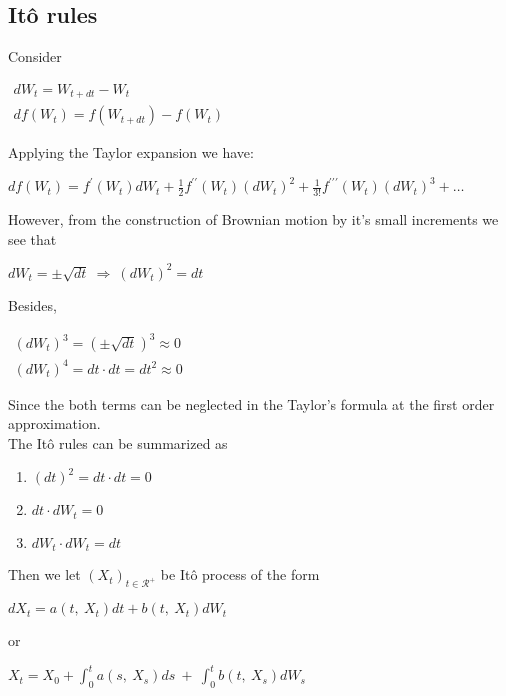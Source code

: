 \documentclass{article}
\begin{document}
\subsection{It\^{o} rules}%
Consider
\begin{center}
	$\begin{array}{l}dW_{t}=W_{t+dt}-W_{t}\\ df\left( W_{t}\right)  =f\left( W_{t+dt}\right)  -f\left( W_{t}\right)  \end{array} $
\end{center}
Applying the Taylor expansion we have:
\begin{center}
	$df\left( W_{t}\right)  =f^{\prime }\left( W_{t}\right)  dW_{t}+\frac{1}{2} f^{\prime \prime }\left( W_{t}\right)  \left( dW_{t}\right)^{2}  +\frac{1}{3!} f^{\prime \prime \prime }\left( W_{t}\right)  \left( dW_{t}\right)^{3}  +\ldots $
\end{center}
However, from the construction of Brownian motion by it's small increments we see that
\begin{center}
	$dW_{t}=\pm \sqrt{dt} \  \Rightarrow \  \left( dW_{t}\right)^{2}  =dt$
\end{center} 
Besides,
\begin{center}
	$\begin{array}{c}\left( dW_{t}\right)^{3}  =\left( \pm \sqrt{dt} \right)^{3}  \approx 0\\ \left( dW_{t}\right)^{4}  =dt\cdot dt=dt^{2}\approx 0\end{array} $
\end{center}
Since the both terms can be neglected in the Taylor's formula at the first order approximation.\\The 
It\^{o} rules can be summarized as
\begin{enumerate}[(1).]
	\item $\left( dt\right)^{2}  =dt\cdot dt=0$
	\item $dt\cdot dW_{t}=0$
	\item $dW_{t}\cdot dW_{t}=dt$
\end{enumerate}
\noindent
Then we let  $(X_{t})_{t\in \mathscr{R}^{+}}$ be It\^{o} process of the form
\begin{center}
	$dX_{t}=a\left( t,\  X_{t}\right)  dt+b\left( t,\  X_{t}\right)  dW_{t}$
\end{center}
or
\begin{center}
	$X_{t}=X_{0}+\int^{t}_{0} a\left( s,\  X_{s}\right)  ds\  +\  \int^{t}_{0} b\left( t,\  X_{s}\right)  dW_{s}$
\end{center}
\end{document}
